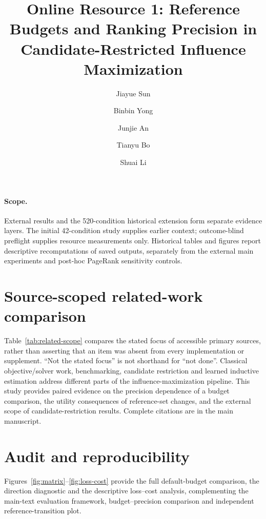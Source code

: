 \documentclass[smallextended]{svjour3}
\begin{document}
\title{Online Resource 1: Reference Budgets and Ranking Precision in Candidate-Restricted Influence Maximization}
\author{Jiayue Sun \and Binbin Yong \and Junjie An \and Tianyu Bo \and Shuai Li}
\date{}\maketitle
\paragraph{Scope.} External results and the 520-condition historical extension form separate evidence layers. The initial 42-condition study supplies earlier context; outcome-blind preflight supplies resource measurements only. Historical tables and figures report descriptive recomputations of saved outputs, separately from the external main experiments and post-hoc PageRank sensitivity controls.

\section{Source-scoped related-work comparison}
Table~\ref{tab:related-scope} compares the stated focus of accessible primary
sources, rather than asserting that an item was absent from every implementation
or supplement. ``Not the stated focus'' is not shorthand for ``not done''.
Classical objective/solver work, benchmarking, candidate restriction and learned
inductive estimation address different parts of the influence-maximization
pipeline. This study provides paired evidence on the precision dependence of a
budget comparison, the utility consequences of reference-set changes, and the
external scope of candidate-restriction results. Complete citations are in the
main manuscript.


\section{Audit and reproducibility}
Figures~\ref{fig:matrix}--\ref{fig:loss-cost} provide the full default-budget
comparison, the direction diagnostic and the descriptive loss--cost analysis,
complementing the main-text evaluation framework, budget--precision comparison
and independent reference-transition plot.
\end{document}
